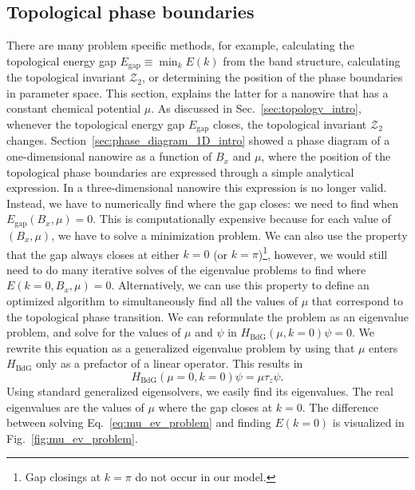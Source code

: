 \subsection{Topological phase boundaries}
There are many problem specific methods, for example, calculating the topological energy gap $E_\textrm{gap} \equiv \min_k E(k)$ from the band structure, calculating the topological invariant $\mathcal{Z}_2$, or determining the position of the phase boundaries in parameter space.
This section, explains the latter for a nanowire that has a constant chemical potential $\mu$.
As discussed in Sec.~\ref{sec:topology_intro}, whenever the topological energy gap $E_\textrm{gap}$ closes, the topological invariant $\mathcal{Z}_2$ changes.
Section~\ref{sec:phase_diagram_1D_intro} showed a phase diagram of a one-dimensional nanowire as a function of $B_x$ and $\mu$, where the position of the topological phase boundaries are expressed through a simple analytical expression.
In a three-dimensional nanowire this expression is no longer valid.
Instead, we have to numerically find where the gap closes: we need to find when $E_\textrm{gap}(B_x, \mu) = 0$.
This is computationally expensive because for each value of $(B_x, \mu)$, we have to solve a minimization problem.
We can also use the property that the gap always closes at either $k=0$ (or $k=\pi$)\footnote{Gap closings at $k=\pi$ do not occur in our model.}, however, we would still need to do many iterative solves of the eigenvalue problems to find where $E(k=0, B_x, \mu)=0$.
Alternatively, we can use this property to define an optimized algorithm to simultaneously find all the values of $\mu$ that correspond to the topological phase transition.
We can reformulate the problem as an eigenvalue problem, and solve for the values of $\mu$ and $\psi$ in $H_\textrm{BdG}(\mu, k=0)\psi=0$.
We rewrite this equation as a generalized eigenvalue problem by using that $\mu$ enters $H_\textrm{BdG}$ only as a prefactor of a linear operator.
This results in
\begin{equation}
H_\textrm{BdG}(\mu=0, k=0)\psi = \mu \tau_z \psi.\label{eq:mu_ev_problem}
\end{equation}
Using standard generalized eigensolvers, we easily find its eigenvalues.
The real eigenvalues are the values of $\mu$ where the gap closes at $k = 0$.
The difference between solving Eq.~\eqref{eq:mu_ev_problem} and finding $E(k=0)$ is visualized in Fig.~\ref{fig:mu_ev_problem}.

